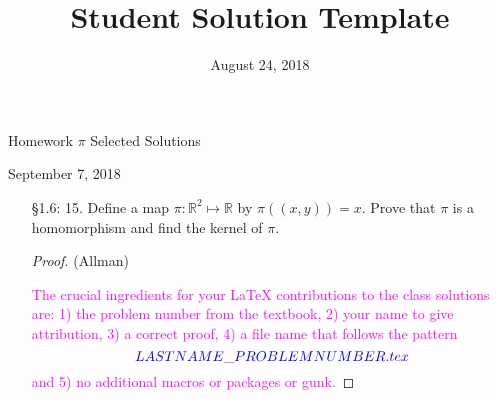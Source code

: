 \documentclass{report}
\title{Student Solution Template}
\date{August 24, 2018}
\newcommand{\assignmentNumber}[1]{Homework #1 Selected Solutions}
\newcommand{\duedate}[1]{#1}
\newcommand\R{{\mathbb R}}
\theoremstyle{plain}
\begin{document}
 

\centerline{\sc \Large \assignmentNumber{$\pi$}}
\smallskip
\centerline{\duedate{September 7, 2018}}

\begin{enumerate}

\item[\S 1.6: 15.] Define a map $\pi: \R^2 \mapsto \R$ by $\pi((x,y)) = x$.  Prove that
$\pi$ is a homomorphism and find the kernel of $\pi$.

\begin{proof} (Allman) 

\textcolor{magenta}{The crucial ingredients for your \LaTeX\xspace
contributions to the class solutions are:
1) the problem number from the textbook, 2) your name to give attribution, 3)
a correct proof, 4) a file name that follows the pattern 
$$
\textcolor{blue}{LASTNAME\_PROBLEMNUMBER.tex}
$$
and 5) no additional macros or packages or gunk.}

\end{proof}


\end{enumerate}
\end{document}
